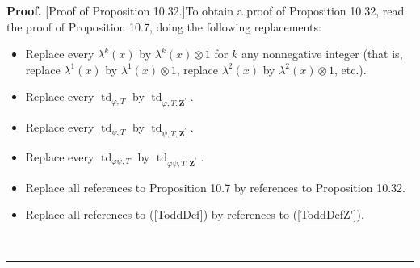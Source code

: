 \documentclass[numbers=enddot,12pt,final,onecolumn,notitlepage]{scrartcl}%
\newenvironment{proof}[1][Proof]{\noindent\textbf{#1.} }{\ \rule{0.5em}{0.5em}}
\begin{document}
\begin{proof}
[Proof of Proposition 10.32.]To obtain a proof of Proposition 10.32, read the
proof of Proposition 10.7, doing the following replacements:

\begin{itemize}
\item Replace every $\lambda^{k}\left(  x\right)  $ by $\lambda^{k}\left(
x\right)  \otimes1$ for $k$ any nonnegative integer (that is, replace
$\lambda^{1}\left(  x\right)  $ by $\lambda^{1}\left(  x\right)  \otimes1$,
replace $\lambda^{2}\left(  x\right)  $ by $\lambda^{2}\left(  x\right)
\otimes1$, etc.).

\item Replace every $\operatorname*{td}\nolimits_{\varphi,T}$ by
$\operatorname*{td}\nolimits_{\varphi,T,\mathbf{Z}^{\prime}}$.

\item Replace every $\operatorname*{td}\nolimits_{\psi,T}$ by
$\operatorname*{td}\nolimits_{\psi,T,\mathbf{Z}^{\prime}}$.

\item Replace every $\operatorname*{td}\nolimits_{\varphi\psi,T}$ by
$\operatorname*{td}\nolimits_{\varphi\psi,T,\mathbf{Z}^{\prime}}$.

\item Replace all references to Proposition 10.7 by references to Proposition 10.32.

\item Replace all references to (\ref{ToddDef}) by references to
(\ref{ToddDefZ'}).
\end{itemize}
\end{proof}
\end{document}
